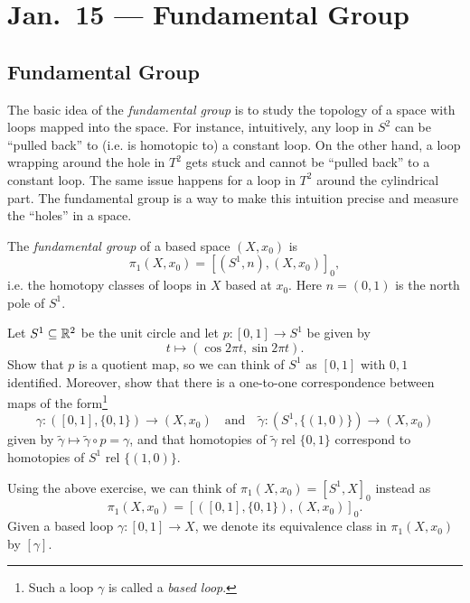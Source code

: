 \chapter{Jan.~15 --- Fundamental Group}

\section{Fundamental Group}

\begin{remark}
  The basic idea of the \emph{fundamental group} is to
  study the topology of a space with loops mapped into
  the space. For instance, intuitively, any loop
  in $S^2$ can be ``pulled back'' to (i.e. is homotopic
  to) a constant loop. On the other hand, a loop
  wrapping around the hole in $T^2$ gets stuck and
  cannot be ``pulled back'' to a constant loop. The
  same issue happens for a loop in $T^2$ around the
  cylindrical part.
  The fundamental group is a way to make this intuition
  precise and measure the ``holes'' in a space.
\end{remark}

\begin{definition}
  The \emph{fundamental group} of a based space
  $(X, x_0)$ is
  \[
    \pi_1(X, x_0) = [(S^1, n), (X, x_0)]_0,
  \]
  i.e. the homotopy classes of loops in $X$ based
  at $x_0$. Here $n = (0, 1)$ is the north pole of
  $S^1$.
\end{definition}

\begin{exercise}
  Let $S^1 \subseteq \mathbb{R}^2$ be the unit circle and
  let $p : [0, 1] \to S^1$ be given by
  \[
    t \mapsto (\cos 2\pi t, \sin 2\pi t).
  \]
  Show that $p$ is a quotient map, so we can think of
  $S^1$ as $[0, 1]$ with $0, 1$ identified. Moreover,
  show that there is a one-to-one correspondence
  between maps of the form\footnote{Such a loop $\gamma$ is called a \emph{based loop}.}
  \[
    \gamma : ([0, 1], \{0, 1\}) \to (X, x_0)
    \quad \text{and} \quad
    \widetilde{\gamma} : (S^1, \{(1, 0)\}) \to (X, x_0)
  \]
  given by $\widetilde{\gamma} \mapsto \widetilde{\gamma} \circ p = \gamma$,
  and that homotopies of $\widetilde{\gamma}$
  rel $\{0, 1\}$ correspond to homotopies of $S^1$
  rel $\{(1, 0)\}$.
\end{exercise}

\begin{remark}
  Using the above exercise, we can think of
  $\pi_1(X, x_0) = [S^1, X]_0$ instead as
  \[
    \pi_1(X, x_0) = [([0, 1], \{0, 1\}), (X, x_0)]_0.
  \]
  Given a based loop $\gamma : [0, 1] \to X$,
  we denote its equivalence class in $\pi_1(X, x_0)$
  by $[\gamma]$.
\end{remark}

